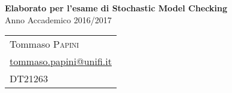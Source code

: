 \begin{center}
    {\huge\bfseries Elaborato per l'esame di Stochastic Model Checking}\\
    Anno Accademico 2016/2017\\[0.8cm]

    \begin{tabular*}{\linewidth}{l}
        Tommaso \textsc{Papini}\\
        \href{mailto:tommaso.papini@unifi.it}{tommaso.papini@unifi.it}\\
        DT21263
    \end{tabular*}\\[1.2cm]
\end{center}
